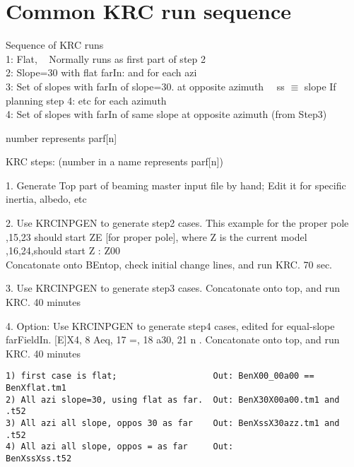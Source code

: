 \documentclass{article}
\begin{document}
\section{Common KRC run sequence }
 Sequence of KRC runs
\\ 1: Flat,  \  
\qi  Normally runs as first part of step 2
\\ 2: Slope=30 with flat farIn: 
\qi  and for each azi 
\\ 3: Set of slopes with farIn of slope=30. at opposite azimuth
\qi   {} \ \ ss $\equiv$ slope
\qi If planning step 4:  etc for each azimuth
\\ 4: Set of slopes with farIn of same slope at opposite azimuth (from Step3)
\qi   {}

number represents parf[n]

KRC steps: (number in a name represents parf[n])

1. Generate Top part of beaming master input file by hand;
\qi  Edit it for specific inertia, albedo, etc

2. Use KRCINPGEN to generate step2 cases. This example for the proper pole
,15,23 should start ZE [for proper pole], where Z is the current model
,16,24,should start Z 
:  Z00 
\\ Concatonate onto BEntop, check initial change lines,  and run KRC.  70 sec.

3. Use KRCINPGEN to generate step3 cases. Concatonate onto top, and run KRC. 40 minutes 

4. Option:  Use KRCINPGEN to generate step4 cases, edited for equal-slope farFieldIn. 
 [E]X4,  8 Aeq, 17 =, 18 a30, 21 n . Concatonate onto top, and run KRC. 40 minutes 

\vspace{-3.mm} 
\begin{verbatim}
1) first case is flat;                   Out: BenX00_00a00 == BenXflat.tm1
2) All azi slope=30, using flat as far.  Out: BenX30X00a00.tm1 and .t52
3) All azi all slope, oppos 30 as far    Out: BenXssX30azz.tm1 and .t52
4) All azi all slope, oppos = as far     Out:             BenXssXss.t52
\end{verbatim}
  
\end{document}
